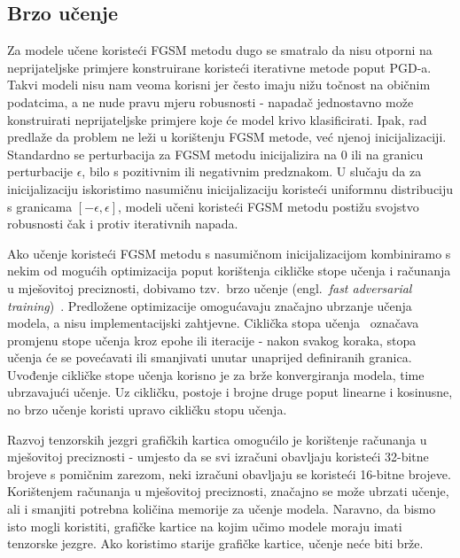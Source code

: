 \documentclass[times, utf8, zavrsni, numeric]{fer}
\begin{document}
\subsection{Brzo učenje}

Za modele učene koristeći FGSM metodu dugo se smatralo da nisu otporni na neprijateljske primjere konstruirane koristeći iterativne metode poput PGD-a.
Takvi modeli nisu nam veoma korisni jer često imaju nižu točnost na običnim podatcima, a ne nude pravu mjeru robusnosti - napadač jednostavno može konstruirati neprijateljske primjere koje će model krivo klasificirati.
Ipak, rad~\cite{wong2020fast} predlaže da problem ne leži u korištenju FGSM metode, već njenoj inicijalizaciji.
Standardno se perturbacija za FGSM metodu inicijalizira na 0 ili na granicu perturbacije $\epsilon$, bilo s pozitivnim ili negativnim predznakom.
U slučaju da za inicijalizaciju iskoristimo nasumičnu inicijalizaciju koristeći uniformnu distribuciju s granicama $[-\epsilon, \epsilon]$, 
modeli učeni koristeći FGSM metodu postižu svojstvo robusnosti čak i protiv iterativnih napada.

Ako učenje koristeći FGSM metodu s nasumičnom inicijalizacijom kombiniramo s nekim od mogućih optimizacija poput korištenja cikličke stope učenja i računanja u mješovitoj preciznosti,
dobivamo tzv.\ brzo učenje (engl.\ \textit{fast adversarial training})~\cite{wong2020fast}. Predložene optimizacije omogućavaju značajno ubrzanje učenja modela, a nisu implementacijski zahtjevne.
Ciklička stopa učenja~\cite{smith2017cyclical} označava promjenu stope učenja kroz epohe ili iteracije - nakon svakog koraka, stopa učenja će se povećavati ili smanjivati unutar unaprijed definiranih granica.
Uvođenje cikličke stope učenja korisno je za brže konvergiranja modela, time ubrzavajući učenje. 
Uz cikličku, postoje i brojne druge poput linearne i kosinusne, no brzo učenje koristi upravo cikličku stopu učenja.

Razvoj tenzorskih jezgri grafičkih kartica omogućilo je korištenje računanja u mješovitoj preciznosti - 
umjesto da se svi izračuni obavljaju koristeći 32-bitne brojeve s pomičnim zarezom, neki izračuni obavljaju se koristeći 16-bitne brojeve.
Korištenjem računanja u mješovitoj preciznosti, značajno se može ubrzati učenje, ali i smanjiti potrebna količina memorije za učenje modela.
Naravno, da bismo isto mogli koristiti, grafičke kartice na kojim učimo modele moraju imati tenzorske jezgre. Ako koristimo starije grafičke kartice, učenje neće biti brže.
\end{document}
